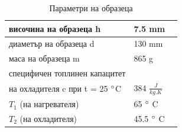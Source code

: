 \documentclass[12pt]{article}
\begin{document}
\begin{table}[h]
\begin{center}
\begin{tabular}{|l|l|l|} \hline
        височина на образеца h & 7.5 mm \\ \hline
        диаметър на образеца d & 130 mm \\ \hline
        маса на образеца m & 865 g \\ \hline
        специфичен топлинен капацитет &  \\ 
        на охладителя c при t = 25 $\degree$C & 384 $\frac{J}{kg.K}$\\ \hline
        $T_1$ (на нагревателя) & 65 $\degree$ C\\ \hline
        $T_2$ (на охладителя) & 45.5 $\degree$ C\\ \hline
\end{tabular}
\caption{\label{tbl:params}Параметри на образеца}
\end{center}
\end{table}
\end{document}
